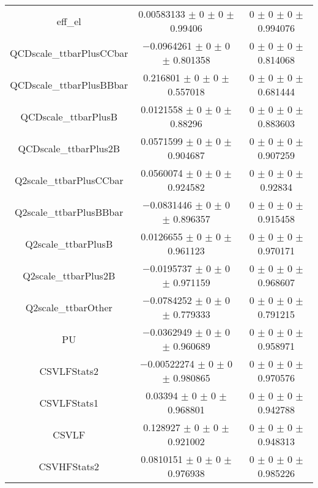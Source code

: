\begin{table}
\begin{tabular}{ccc}
eff\_el & \num{0.00583133} $\pm$ \num{0} $\pm$ \num{0} $\pm$ \num{0.99406} & \num{0} $\pm$ \num{0} $\pm$ \num{0} $\pm$ \num{0.994076}\\
QCDscale\_ttbarPlusCCbar & \num{-0.0964261} $\pm$ \num{0} $\pm$ \num{0} $\pm$ \num{0.801358} & \num{0} $\pm$ \num{0} $\pm$ \num{0} $\pm$ \num{0.814068}\\
QCDscale\_ttbarPlusBBbar & \num{0.216801} $\pm$ \num{0} $\pm$ \num{0} $\pm$ \num{0.557018} & \num{0} $\pm$ \num{0} $\pm$ \num{0} $\pm$ \num{0.681444}\\
QCDscale\_ttbarPlusB & \num{0.0121558} $\pm$ \num{0} $\pm$ \num{0} $\pm$ \num{0.88296} & \num{0} $\pm$ \num{0} $\pm$ \num{0} $\pm$ \num{0.883603}\\
QCDscale\_ttbarPlus2B & \num{0.0571599} $\pm$ \num{0} $\pm$ \num{0} $\pm$ \num{0.904687} & \num{0} $\pm$ \num{0} $\pm$ \num{0} $\pm$ \num{0.907259}\\
Q2scale\_ttbarPlusCCbar & \num{0.0560074} $\pm$ \num{0} $\pm$ \num{0} $\pm$ \num{0.924582} & \num{0} $\pm$ \num{0} $\pm$ \num{0} $\pm$ \num{0.92834}\\
Q2scale\_ttbarPlusBBbar & \num{-0.0831446} $\pm$ \num{0} $\pm$ \num{0} $\pm$ \num{0.896357} & \num{0} $\pm$ \num{0} $\pm$ \num{0} $\pm$ \num{0.915458}\\
Q2scale\_ttbarPlusB & \num{0.0126655} $\pm$ \num{0} $\pm$ \num{0} $\pm$ \num{0.961123} & \num{0} $\pm$ \num{0} $\pm$ \num{0} $\pm$ \num{0.970171}\\
Q2scale\_ttbarPlus2B & \num{-0.0195737} $\pm$ \num{0} $\pm$ \num{0} $\pm$ \num{0.971159} & \num{0} $\pm$ \num{0} $\pm$ \num{0} $\pm$ \num{0.968607}\\
Q2scale\_ttbarOther & \num{-0.0784252} $\pm$ \num{0} $\pm$ \num{0} $\pm$ \num{0.779333} & \num{0} $\pm$ \num{0} $\pm$ \num{0} $\pm$ \num{0.791215}\\
PU & \num{-0.0362949} $\pm$ \num{0} $\pm$ \num{0} $\pm$ \num{0.960689} & \num{0} $\pm$ \num{0} $\pm$ \num{0} $\pm$ \num{0.958971}\\
CSVLFStats2 & \num{-0.00522274} $\pm$ \num{0} $\pm$ \num{0} $\pm$ \num{0.980865} & \num{0} $\pm$ \num{0} $\pm$ \num{0} $\pm$ \num{0.970576}\\
CSVLFStats1 & \num{0.03394} $\pm$ \num{0} $\pm$ \num{0} $\pm$ \num{0.968801} & \num{0} $\pm$ \num{0} $\pm$ \num{0} $\pm$ \num{0.942788}\\
CSVLF & \num{0.128927} $\pm$ \num{0} $\pm$ \num{0} $\pm$ \num{0.921002} & \num{0} $\pm$ \num{0} $\pm$ \num{0} $\pm$ \num{0.948313}\\
CSVHFStats2 & \num{0.0810151} $\pm$ \num{0} $\pm$ \num{0} $\pm$ \num{0.976938} & \num{0} $\pm$ \num{0} $\pm$ \num{0} $\pm$ \num{0.985226}\\

\end{tabular}
\end{table}
